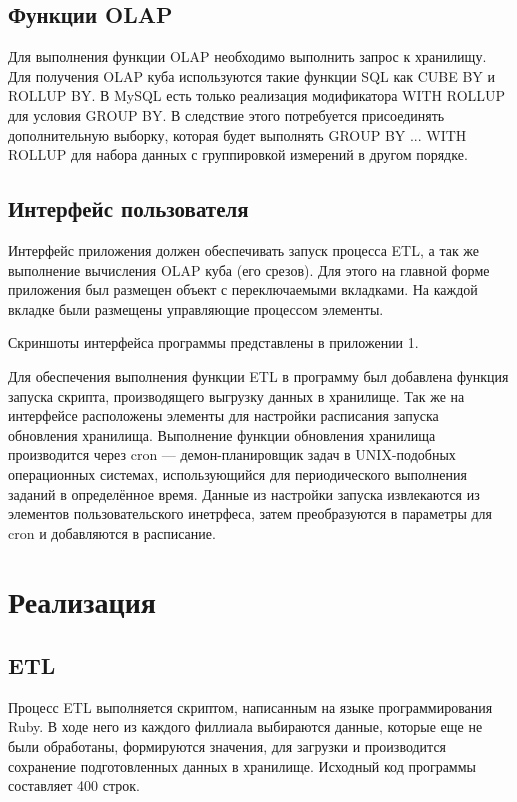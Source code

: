 \subsection{Функции OLAP}
Для выполнения функции OLAP необходимо выполнить запрос к хранилищу. Для получения OLAP куба используются такие функции SQL как CUBE BY и ROLLUP BY. В MySQL есть только реализация модификатора WITH ROLLUP для условия GROUP BY. В следствие этого потребуется присоединять дополнительную выборку, которая будет выполнять GROUP BY ... WITH ROLLUP для набора данных с группировкой измерений в другом порядке.

\subsection{Интерфейс пользователя}
Интерфейс приложения должен обеспечивать запуск процесса ETL, а так же выполнение вычисления OLAP куба (его срезов). Для этого на главной форме приложения был размещен объект с переключаемыми вкладками. На каждой вкладке были размещены управляющие процессом элементы.\par
Скриншоты интерфейса программы представлены в приложении 1. \par
Для обеспечения выполнения функции ETL в программу был добавлена функция запуска скрипта, производящего выгрузку данных в хранилище. Так же на интерфейсе расположены элементы для настройки расписания запуска обновления хранилища. Выполнение функции обновления хранилища производится через cron — демон-планировщик задач в UNIX-подобных операционных системах, использующийся для периодического выполнения заданий в определённое время. Данные из настройки запуска извлекаются из элементов пользовательского инетрфеса, затем преобразуются в параметры для cron и добавляются в расписание. \par

\section{Реализация}
\subsection{ETL}
Процесс ETL выполняется скриптом, написанным на языке программирования Ruby. В ходе него из каждого филлиала выбираются данные, которые еще не были обработаны, формируются значения, для загрузки и производится сохранение подготовленных данных в хранилище. Исходный код программы составляет 400 строк.
